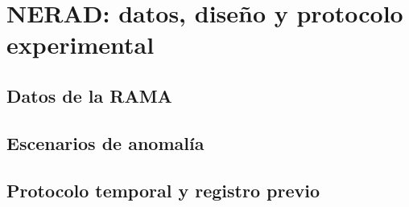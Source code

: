 \chapter{NERAD: datos, diseño y protocolo experimental}
\label{cap:metodo}

\section{Datos de la RAMA}
\label{sec:datos}

\section{Escenarios de anomalía}
\label{sec:escenarios}

\section{Protocolo temporal y registro previo}
\label{sec:protocolo}

